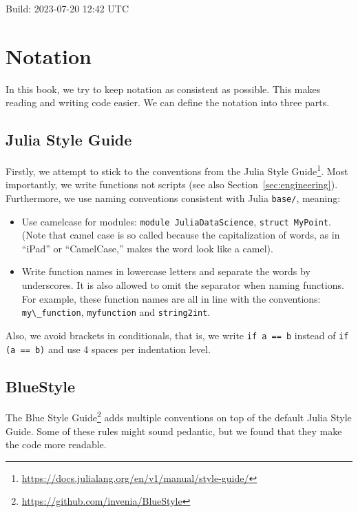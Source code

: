 \documentclass[
  notoc %
]{tufte-book}
\DeclareRobustCommand{\href}[2]{#2\footnote{\url{#1}}}
\providecommand{\tightlist}{%
  \setlength{\itemsep}{0pt}\setlength{\parskip}{0pt}
}
\newcommand{\passthrough}[1]{#1}
\begin{document}
Build: 2023-07-20 12:42 UTC

\hypertarget{sec:notation}{%
\section{Notation}\label{sec:notation}}

In this book, we try to keep notation as consistent as possible. This
makes reading and writing code easier. We can define the notation into
three parts.

\hypertarget{julia-style-guide}{%
\subsection{Julia Style Guide}\label{julia-style-guide}}

Firstly, we attempt to stick to the conventions from the
\href{https://docs.julialang.org/en/v1/manual/style-guide/}{Julia Style
Guide}. Most importantly, we write functions not scripts (see also
Section~\ref{sec:engineering}). Furthermore, we use naming conventions
consistent with Julia \passthrough{\lstinline!base/!}, meaning:

\begin{itemize}
\tightlist
\item
  Use camelcase for modules:
  \passthrough{\lstinline!module JuliaDataScience!},
  \passthrough{\lstinline!struct MyPoint!}. (Note that camel case is so
  called because the capitalization of words, as in ``iPad'' or
  ``CamelCase,'' makes the word look like a camel).
\item
  Write function names in lowercase letters and separate the words by
  underscores. It is also allowed to omit the separator when naming
  functions. For example, these function names are all in line with the
  conventions: \passthrough{\lstinline!my\_function!},
  \passthrough{\lstinline!myfunction!} and
  \passthrough{\lstinline!string2int!}.
\end{itemize}

Also, we avoid brackets in conditionals, that is, we write
\passthrough{\lstinline!if a == b!} instead of
\passthrough{\lstinline!if (a == b)!} and use 4 spaces per indentation
level.

\hypertarget{bluestyle}{%
\subsection{BlueStyle}\label{bluestyle}}

The \href{https://github.com/invenia/BlueStyle}{Blue Style Guide} adds
multiple conventions on top of the default Julia Style Guide. Some of
these rules might sound pedantic, but we found that they make the code
more readable.
\end{document}
